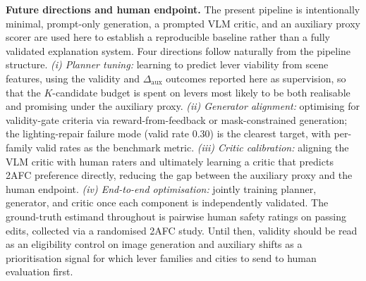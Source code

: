 \noindent\textbf{Future directions and human endpoint.}
The present pipeline is intentionally minimal, prompt-only generation, a prompted VLM critic, and an auxiliary proxy scorer are used here to establish a reproducible baseline rather than a fully validated explanation system. Four directions follow naturally from the
pipeline structure. \emph{(i) Planner tuning:} learning to predict lever
viability from scene features, using the validity and
$\Delta_{\mathrm{aux}}$ outcomes reported here as supervision, so that
the $K$-candidate budget is spent on levers most likely to be both
realisable and promising under the auxiliary proxy. \emph{(ii) Generator alignment:} optimising
for validity-gate criteria via reward-from-feedback or mask-constrained
generation; the lighting-repair failure mode (valid rate 0.30) is the
clearest target, with per-family valid rates as the benchmark metric.
\emph{(iii) Critic calibration:} aligning the VLM critic with human
raters and ultimately learning a critic that predicts 2AFC preference
directly, reducing the gap between the auxiliary proxy and the human
endpoint. \emph{(iv) End-to-end optimisation:} jointly training planner,
generator, and critic once each component is independently validated.
The ground-truth estimand throughout is pairwise human safety ratings on passing edits, collected via a randomised 2AFC study. Until then,
validity should be read as an eligibility control on image generation
and auxiliary shifts as a prioritisation signal for which lever
families and cities to send to human evaluation first.
